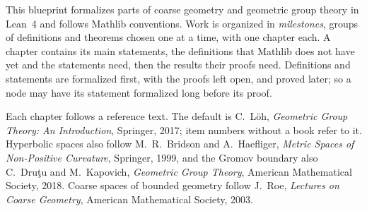 %
%



This blueprint formalizes parts of coarse geometry and geometric group theory in Lean~4 and 
follows Mathlib conventions. Work is organized in \emph{milestones}, groups of definitions
and theorems chosen one at a time, with one chapter each. A chapter contains its main
statements, the definitions that Mathlib does not have yet and the statements need, then the
results their proofs need. Definitions and statements are formalized first, with the proofs left
open, and proved later; so a node may have its statement formalized long before its proof.

Each chapter follows a reference text. The default is C.~L\"oh, \emph{Geometric Group Theory:
An Introduction}, Springer, 2017; item numbers without a book refer to it. Hyperbolic spaces
also follow M.~R.~Bridson and A.~Haefliger, \emph{Metric Spaces of Non-Positive Curvature},
Springer, 1999, and the Gromov boundary also C.~Dru\c{t}u and M.~Kapovich, \emph{Geometric Group
Theory}, American Mathematical Society, 2018. Coarse spaces of bounded geometry follow J.~Roe,
\emph{Lectures on Coarse Geometry}, American Mathematical Society, 2003.

